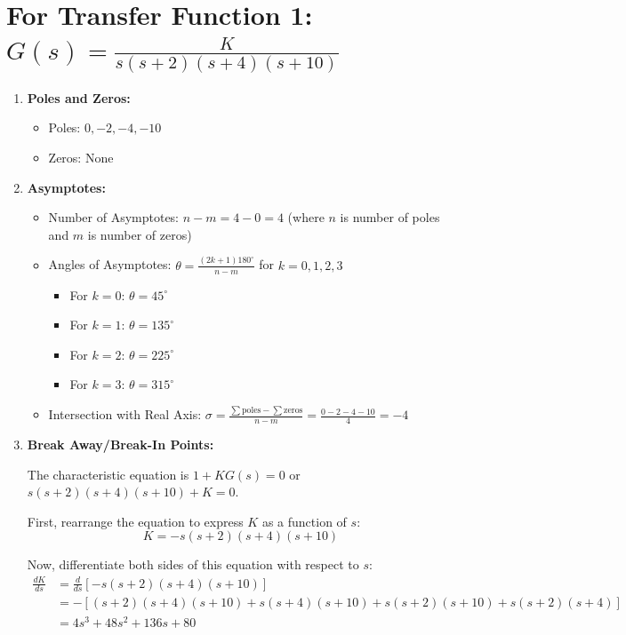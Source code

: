 \documentclass{article}
\begin{document}
\section*{For Transfer Function 1: \( G(s) = \frac{K}{s(s+2)(s+4)(s+10)} \)}

\begin{enumerate}
    \item \textbf{Poles and Zeros:}
    \begin{itemize}
        \item Poles: \( 0, -2, -4, -10 \)
        \item Zeros: None
    \end{itemize}

    \item \textbf{Asymptotes:}
    \begin{itemize}
        \item Number of Asymptotes: \( n - m = 4 - 0 = 4 \) (where \( n \) is number of poles and \( m \) is number of zeros)
        \item Angles of Asymptotes: \( \theta = \frac{(2k+1)180^\circ}{n-m} \) for \( k = 0, 1, 2, 3 \)
        \begin{itemize}
            \item For \( k = 0 \): \( \theta = 45^\circ \)
            \item For \( k = 1 \): \( \theta = 135^\circ \)
            \item For \( k = 2 \): \( \theta = 225^\circ \)
            \item For \( k = 3 \): \( \theta = 315^\circ \)
        \end{itemize}
        \item Intersection with Real Axis: \( \sigma = \frac{\sum \text{poles} - \sum \text{zeros}}{n - m} = \frac{0 - 2 - 4 - 10}{4} = -4 \)
    \end{itemize}

    \item \textbf{Break Away/Break-In Points:}

The characteristic equation is \( 1 + KG(s) = 0 \) or \( s(s+2)(s+4)(s+10) + K = 0 \).

First, rearrange the equation to express \( K \) as a function of \( s \):
\[ K = -s(s+2)(s+4)(s+10) \]

Now, differentiate both sides of this equation with respect to \( s \):
\begin{align*}
\frac{dK}{ds} &= \frac{d}{ds} \left[ -s(s+2)(s+4)(s+10) \right] \\
&= -\left[ (s+2)(s+4)(s+10) + s(s+4)(s+10) + s(s+2)(s+10) + s(s+2)(s+4)\right] \\
&= 4s^3+48s^2+136s+80
\end{align*}



\end{enumerate}
\end{document}
